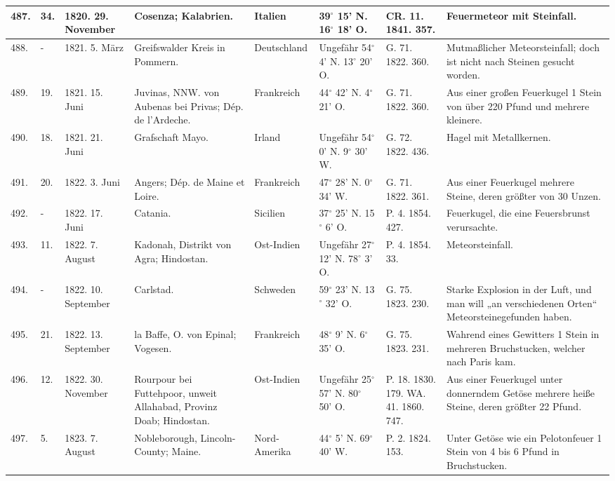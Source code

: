 \documentclass[a4paper, 11pt, oneside, polutonikogreek, german]{article}
\begin{document}
\begin{table}[!ht]
\begin{tabular}{|l|l|l|l|l|l|l|l|}
        487. & 34. & 1820. 29. November & Cosenza; Kalabrien. & Italien & 39$^\circ$ 15' N. 16$^\circ$ 18' O. & CR. 11. 1841. 357. & Feuermeteor mit Steinfall. \\ \hline
        488. & - & 1821. 5. März & Greifswalder Kreis in Pommern. & Deutschland & Ungefähr 54$^\circ$ 4' N. 13$^\circ$ 20' O. & G. 71. 1822. 360. & Mutmaßlicher Meteorsteinfall; doch ist nicht nach Steinen gesucht worden. \\ \hline
        489. & 19. & 1821. 15. Juni & Juvinas, NNW. von Aubenas bei Privas; Dép. de l’Ardeche. & Frankreich & 44$^\circ$ 42' N. 4$^\circ$ 21' O. & G. 71. 1822. 360. & Aus einer großen Feuerkugel 1 Stein von über 220 Pfund und mehrere kleinere. \\ \hline
        490. & 18. & 1821. 21. Juni & Grafschaft Mayo. & Irland & Ungefähr 54$^\circ$ 0' N. 9$^\circ$ 30' W. & G. 72. 1822. 436. & Hagel mit Metallkernen. \\ \hline
        491. & 20. & 1822. 3. Juni & Angers; Dép. de Maine et Loire. & Frankreich & 47$^\circ$ 28' N. 0$^\circ$ 34' W. & G. 71. 1822. 361. & Aus einer Feuerkugel mehrere Steine, deren größter von 30 Unzen. \\ \hline
        492. & - & 1822. 17. Juni & Catania. & Sicilien & 37$^\circ$ 25' N. 15$^\circ$ 6' O. & P. 4. 1854. 427. & Feuerkugel, die eine Feuersbrunst verursachte. \\ \hline
        493. & 11. & 1822. 7. August & Kadonah, Distrikt von Agra; Hindostan. & Ost-Indien & Ungefähr 27$^\circ$ 12' N. 78$^\circ$ 3' O. & P. 4. 1854. 33. & Meteorsteinfall. \\ \hline
        494. & - & 1822. 10. September & Carlstad. & Schweden & 59$^\circ$ 23' N. 13$^\circ$ 32' O. & G. 75. 1823. 230. & Starke Explosion in der Luft, und man will „an verschiedenen Orten“ Meteorsteinegefunden haben. \\ \hline
        495. & 21. & 1822. 13. September & la Baffe, O. von Epinal; Vogesen. & Frankreich & 48$^\circ$ 9' N. 6$^\circ$ 35' O. & G. 75. 1823. 231. & Wahrend eines Gewitters 1 Stein in mehreren Bruchstucken, welcher nach Paris kam. \\ \hline
        496. & 12. & 1822. 30. November & Rourpour bei Futtehpoor, unweit Allahabad, Provinz Doab; Hindostan. & Ost-Indien & Ungefähr 25$^\circ$ 57' N. 80$^\circ$ 50' O. & P. 18. 1830. 179. WA. 41. 1860. 747. & Aus einer Feuerkugel unter donnerndem Getöse mehrere heiße Steine, deren größter 22 Pfund. \\ \hline
        497. & 5. & 1823. 7. August & Nobleborough, Lincoln-County; Maine. & Nord-Amerika & 44$^\circ$ 5' N. 69$^\circ$ 40' W. & P. 2. 1824. 153. & Unter Getöse wie ein Pelotonfeuer 1 Stein von 4 bis 6 Pfund in Bruchstucken. \\ \hline

\end{tabular}
\end{table}
\end{document}
